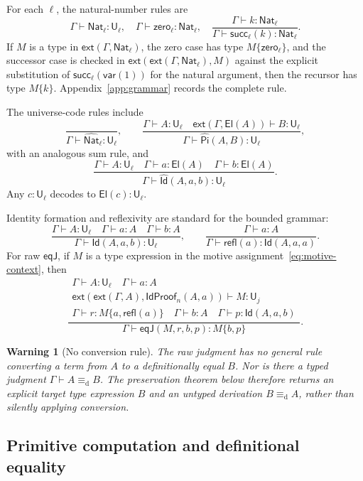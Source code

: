 \documentclass[10pt,reqno]{amsart}
\newtheorem{warning}[theorem]{Warning}
\newcommand{\Ext}[2]{\mathsf{ext}(#1,#2)}
\newcommand{\Var}{\mathsf{var}}
\newcommand{\Sort}{\mathsf{U}}
\newcommand{\NatTy}{\mathsf{Nat}}
\newcommand{\Zero}{\mathsf{zero}}
\newcommand{\Succ}{\mathsf{succ}}
\newcommand{\CodeNat}{\widehat{\mathsf{Nat}}}
\newcommand{\CodePi}{\widehat{\mathsf{Pi}}}
\newcommand{\CodeId}{\widehat{\mathsf{Id}}}
\newcommand{\El}{\mathsf{El}}
\newcommand{\IdTy}{\mathsf{Id}}
\newcommand{\Refl}{\mathsf{refl}}
\newcommand{\EqJ}{\mathsf{eqJ}}
\newcommand{\defeq}{\mathrel{\equiv_{\mathrm d}}}
\begin{document}
For each \(\ell\), the natural-number rules are
\[
\Gamma\vdash\NatTy_\ell:\Sort_\ell,\quad
\Gamma\vdash\Zero_\ell:\NatTy_\ell,\quad
\frac{\Gamma\vdash k:\NatTy_\ell}
     {\Gamma\vdash\Succ_\ell(k):\NatTy_\ell}.
\]
If \(M\) is a type in \(\Ext{\Gamma}{\NatTy_\ell}\), the zero case has type
\(M\{\Zero_\ell\}\), and the successor case is checked in
\(\Ext{\Ext{\Gamma}{\NatTy_\ell}}{M}\) against the explicit substitution of
\(\Succ_\ell(\Var(1))\) for the natural argument, then the recursor has type
\(M\{k\}\).  Appendix~\ref{app:grammar} records the complete rule.

The universe-code rules include
\[
\frac{}{\Gamma\vdash\CodeNat_\ell:\Sort_\ell},
\qquad
\frac{\Gamma\vdash A:\Sort_\ell\quad
      \Ext{\Gamma}{\El(A)}\vdash B:\Sort_\ell}
     {\Gamma\vdash\CodePi(A,B):\Sort_\ell},
\]
with an analogous sum rule, and
\[
\frac{\Gamma\vdash A:\Sort_\ell\quad
      \Gamma\vdash a:\El(A)\quad\Gamma\vdash b:\El(A)}
     {\Gamma\vdash\CodeId(A,a,b):\Sort_\ell}.
\]
Any \(c:\Sort_\ell\) decodes to \(\El(c):\Sort_\ell\).

Identity formation and reflexivity are standard for the bounded grammar:
\[
\frac{\Gamma\vdash A:\Sort_\ell\quad\Gamma\vdash a:A\quad
      \Gamma\vdash b:A}
     {\Gamma\vdash\IdTy(A,a,b):\Sort_\ell},
\qquad
\frac{\Gamma\vdash a:A}
     {\Gamma\vdash\Refl(a):\IdTy(A,a,a)}.
\]
For raw \(\EqJ\), if \(M\) is a type expression in the motive
assignment~\eqref{eq:motive-context}, then
\[
\frac{
 \begin{array}{c}
 \Gamma\vdash A:\Sort_\ell\quad\Gamma\vdash a:A\\
 \Ext{\Ext{\Gamma}{A}}{\mathsf{IdProof}_n(A,a)}
      \vdash M:\Sort_j\\
 \Gamma\vdash r:M\{a,\Refl(a)\}\quad
 \Gamma\vdash b:A\quad
 \Gamma\vdash p:\IdTy(A,a,b)
 \end{array}}
 {\Gamma\vdash\EqJ(M,r,b,p):M\{b,p\}}.
\tag{5.1}\label{eq:eqj-rule}
\]

\begin{warning}[No conversion rule]
The raw judgment has no general rule converting a term from \(A\) to a
definitionally equal \(B\).  Nor is there a typed judgment
\(\Gamma\vdash A\defeq B\).  The preservation theorem below therefore
returns an explicit target type expression \(B\) and an \emph{untyped}
derivation \(B\defeq A\), rather than silently applying conversion.
\end{warning}

\subsection{Primitive computation and definitional equality}
\end{document}
